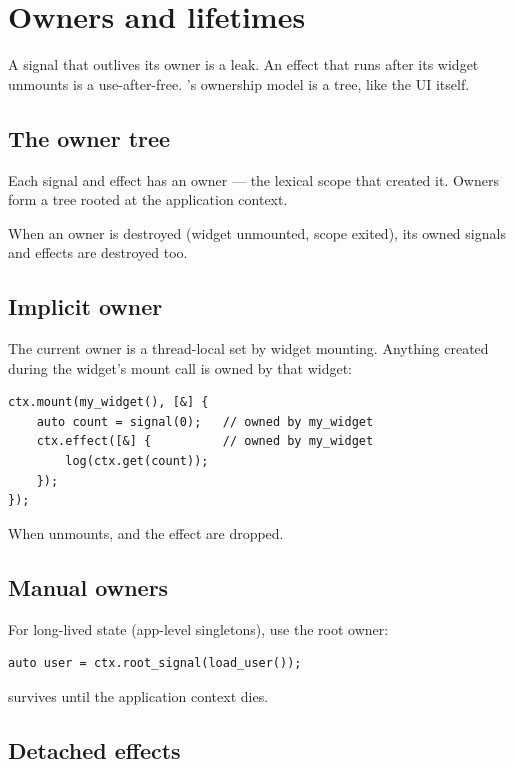 \chapter{Owners and lifetimes}
\label{ch:owners}

\begin{aside}
A signal that outlives its owner is a leak. An effect that
runs after its widget unmounts is a use-after-free. \maya{}'s
ownership model is a tree, like the UI itself.
\end{aside}

\section{The owner tree}

Each signal and effect has an owner --- the lexical scope
that created it. Owners form a tree rooted at the application
context.

When an owner is destroyed (widget unmounted, scope exited),
its owned signals and effects are destroyed too.

\section{Implicit owner}

The current owner is a thread-local set by widget mounting.
Anything created during the widget's mount call is owned by
that widget:

\begin{lstlisting}
ctx.mount(my_widget(), [&] {
    auto count = signal(0);   // owned by my_widget
    ctx.effect([&] {          // owned by my_widget
        log(ctx.get(count));
    });
});
\end{lstlisting}

When  unmounts,  and the
effect are dropped.

\section{Manual owners}

For long-lived state (app-level singletons), use the root
owner:

\begin{lstlisting}
auto user = ctx.root_signal(load_user());
\end{lstlisting}

 survives until the application context dies.

\section{Detached effects}

